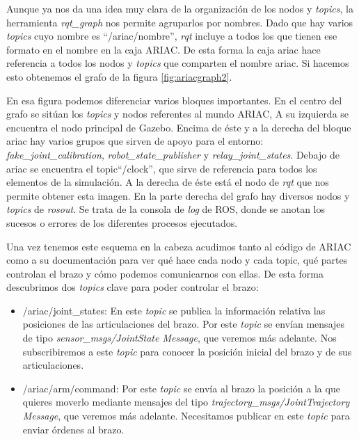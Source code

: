 Aunque ya nos da una idea muy clara de la organización de los nodos y \textit{topics}, la herramienta \textit{rqt\_graph} nos permite agruparlos por nombres. Dado que hay varios \textit{topics} cuyo nombre es “/ariac/nombre”, \textit{rqt} incluye a todos los que tienen ese formato en el nombre en la caja ARIAC. De esta forma la caja ariac hace referencia a todos los nodos y \textit{topics} que comparten el nombre ariac. Si hacemos esto obtenemos el grafo de la figura \ref{fig:ariacgraph2}.

En esa figura podemos diferenciar varios bloques importantes. En el centro del grafo se sitúan los \textit{topics} y nodos referentes al mundo ARIAC, A su izquierda se encuentra el nodo principal de Gazebo. Encima de éste y a la derecha del bloque ariac hay varios grupos que sirven de apoyo para el entorno: \textit{fake\_joint\_calibration}, \textit{robot\_state\_publisher} y \textit{relay\_joint\_states}.
Debajo de ariac se encuentra el topic“/clock”, que sirve de referencia para todos los elementos de la simulación. A la derecha de éste está el nodo de \textit{rqt} que nos permite obtener esta imagen. En la parte derecha del grafo hay diversos nodos y \textit{topics} de \textit{rosout}. Se trata de la consola de \textit{log} de ROS, donde se anotan los sucesos o errores de los diferentes procesos ejecutados.

Una vez tenemos este esquema en la cabeza acudimos tanto al código de ARIAC como a su documentación para ver qué hace cada nodo y cada topic, qué partes controlan el brazo y cómo podemos comunicarnos con ellas. De esta forma descubrimos dos \textit{topics} clave para poder controlar el brazo:
\begin{itemize}
	\item /ariac/joint\_states: En este \textit{topic} se publica la información relativa las posiciones de las articulaciones del brazo. Por este \textit{topic} se envían mensajes de tipo \textit{sensor\_msgs/JointState Message}, que veremos más adelante. Nos subscribiremos a este \textit{topic} para conocer la posición inicial del brazo y de sus articulaciones.
	
	\item /ariac/arm/command: Por este \textit{topic} se envía al brazo la posición a la que quieres moverlo mediante mensajes del tipo \textit{trajectory\_msgs/JointTrajectory Message}, que veremos más adelante. Necesitamos publicar en este \textit{topic} para enviar órdenes al brazo.
	
\end{itemize}

